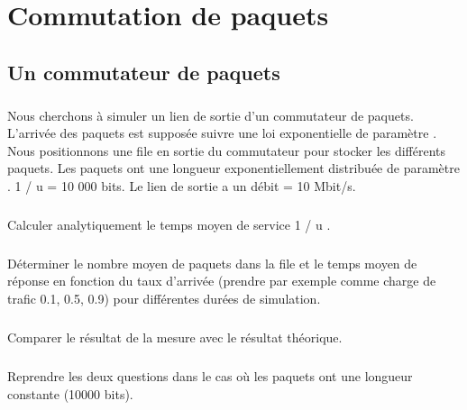 
\chapter{Commutation de paquets}

    \section{Un commutateur de paquets}

        \paragraph{}
        Nous cherchons à simuler un lien de sortie d'un commutateur de paquets. L'arrivée des paquets est supposée suivre une loi exponentielle de paramètre . Nous positionnons une file en sortie du commutateur pour stocker les différents paquets. Les paquets ont une longueur exponentiellement distribuée de paramètre . 1 / u = 10 000 bits. Le lien de sortie a un débit = 10 Mbit/s.

        \paragraph{}
        Calculer analytiquement le temps moyen de service 1 / u .

        \paragraph{}
        Déterminer le nombre moyen de paquets dans la file et le temps moyen de réponse en fonction du taux d'arrivée (prendre par exemple comme charge de trafic 0.1, 0.5, 0.9) pour différentes durées de simulation.

        \paragraph{}
        Comparer le résultat de la mesure avec le résultat théorique.

        \paragraph{}
        Reprendre les deux questions dans le cas où les paquets ont une longueur constante (10000 bits).


    \clearpage

